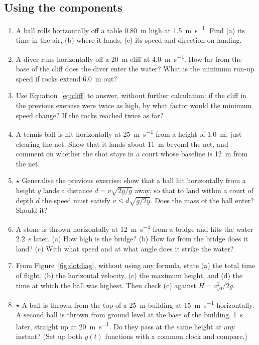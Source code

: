 \documentclass[11pt,twoside,openany]{book}
\newcounter{check}[chapter]
\begin{document}
\subsection*{Using the components}
\begin{enumerate}[label=\textbf{\thechapter.\arabic*},resume=exercises,leftmargin=*]
  \item A ball rolls horizontally off a table \SI{0.80}{\metre} high at \SI{1.5}{\metre\per\second}. Find (a) its time in the air, (b) where it lands, (c) its speed and direction on landing.
  \item A diver runs horizontally off a \SI{20}{\metre} cliff at \SI{4.0}{\metre\per\second}. How far from the base of the cliff does the diver enter the water? What is the minimum run-up speed if rocks extend \SI{6.0}{\metre} out?
  \item Use Equation~\eqref{eq:cliff} to answer, without further calculation: if the cliff in the previous exercise were twice as high, by what factor would the minimum speed change? If the rocks reached twice as far?
  \item A tennis ball is hit horizontally at \SI{25}{\metre\per\second} from a height of \SI{1.0}{\metre}, just clearing the net. Show that it lands about \SI{11}{\metre} beyond the net, and comment on whether the shot stays in a court whose baseline is \SI{12}{\metre} from the net.
  \item $\star$ Generalise the previous exercise: show that a ball hit horizontally from a height $y$ lands a distance $d = v\sqrt{2y/g}$ away, so that to land within a court of depth $d$ the speed must satisfy $v \le d\sqrt{g/2y}$. Does the mass of the ball enter? Should it?
  \item A stone is thrown horizontally at \SI{12}{\metre\per\second} from a bridge and hits the water \SI{2.2}{\second} later. (a) How high is the bridge? (b) How far from the bridge does it land? (c) With what speed and at what angle does it strike the water?
  \item From Figure~\ref{fig:dotdiag}, without using any formula, state (a) the total time of flight, (b) the horizontal velocity, (c) the maximum height, and (d) the time at which the ball was highest. Then check (c) against $H = v_{y0}^2/2g$.
  \item $\star$ A ball is thrown from the top of a \SI{25}{\metre} building at \SI{15}{\metre\per\second} horizontally. A second ball is thrown from ground level at the base of the building, \SI{1}{\second} later, straight up at \SI{20}{\metre\per\second}. Do they pass at the same height at any instant? (Set up both $y(t)$ functions with a common clock and compare.)
\end{enumerate}
\end{document}
